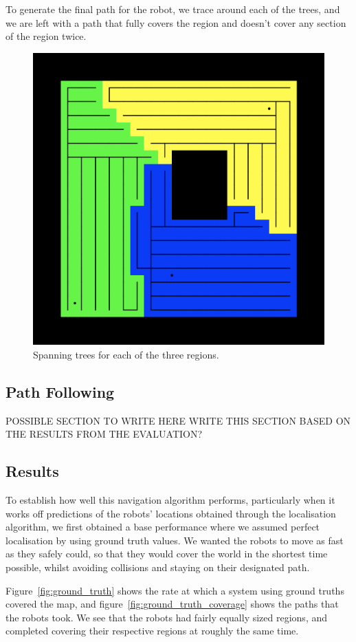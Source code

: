 \documentclass[a4paper, 10pt, conference]{ieeeconf}      %
\begin{document}
To generate the final path for the robot, we trace around each of the trees, and we are left with a path that fully covers the region and doesn't cover any section of the region twice.

\begin{figure}
	\centering
	\includegraphics[width=0.8\columnwidth]{figure_mst.png}
	\caption{Spanning trees for each of the three regions.}
	\label{fig:mst}
\end{figure}

\subsection{Path Following}
POSSIBLE SECTION TO WRITE HERE
WRITE THIS SECTION BASED ON THE RESULTS FROM THE EVALUATION?


\subsection{Results}
To establish how well this navigation algorithm performs, particularly when it works off predictions of the robots' locations obtained through the localisation algorithm, we first obtained a base performance where we assumed perfect localisation by using ground truth values. We wanted the robots to move as fast as they safely could, so that they would cover the world in the shortest time possible, whilst avoiding collisions and staying on their designated path.

Figure~\ref{fig:ground_truth} shows the rate at which a system using ground truths covered the map, and figure~\ref{fig:ground_truth_coverage} shows the paths that the robots took. We see that the robots had fairly equally sized regions, and completed covering their respective regions at roughly the same time.
\end{document}
